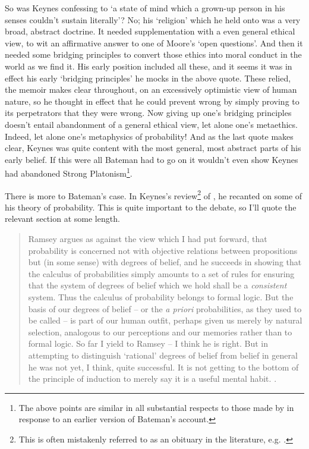 \noindent So was Keynes confessing to `a state of mind which a grown-up person in his senses couldn't sustain literally'? No; his `religion' which he held onto was a very broad, abstract doctrine. It needed supplementation with a even general ethical view, to wit an affirmative answer to one of Moore's `open questions'. And then it needed some bridging principles to convert those ethics into moral conduct in the world as we find it. His early position included all these, and it seems it was in effect his early `bridging principles' he mocks in the above quote. These relied, the memoir makes clear throughout, on an excessively optimistic view of human nature, so he thought in effect that he could prevent wrong by simply proving to its perpetrators that they were wrong. Now giving up one's bridging principles doesn't entail abandonment of a general ethical view, let alone one's metaethics. Indeed, let alone one's metaphysics of probability! And as the last quote makes clear, Keynes was quite content with the most general, most abstract parts of his early belief. If this were all Bateman had to go on it wouldn't even show Keynes had abandoned Strong Platonism\footnote{The above points are similar in all substantial respects to those made by \citet{ODonnell1991} in response to an earlier version of Bateman's account.}.

There is more to Bateman's case. In Keynes's review\footnote{This is often mistakenly referred to as an obituary in the literature, e.g. \cite[139]{Coates1996}.} of \citet{RamseyFM}, he recanted on some of his theory of probability. This is quite important to the debate, so I'll quote the relevant section at some length.

\begin{quote}
Ramsey argues as against the view which I had put forward, that probability is concerned not with objective relations between propositions but (in some sense) with degrees of belief, and he succeeds in showing that the calculus of probabilities simply amounts to a set of rules for ensuring that the system of degrees of belief which we hold shall be a \textit{consistent} system. Thus the calculus of probability belongs to formal logic. But the basis of our degrees of belief -- or the \textit{a priori} probabilities, as they used to be called -- is part of our human outfit, perhaps given us merely by natural selection, analogous to our perceptions and our memories rather than to formal logic. So far I yield to Ramsey -- I think he is right. But in attempting to distinguish `rational' degrees of belief from belief in general he was not yet, I think, quite successful. It is not getting to the bottom of the principle of induction to merely say it is a useful mental habit. \cite[338-339]{Keynes1931}.
\end{quote}

